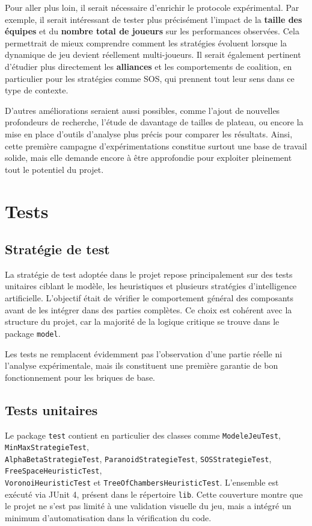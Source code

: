 \documentclass[11pt,a4paper]{article}
\begin{document}
Pour aller plus loin, il serait nécessaire d’enrichir le protocole expérimental. Par exemple, il serait intéressant de tester plus précisément l’impact de la \textbf{taille des équipes} et du \textbf{nombre total de joueurs} sur les performances observées. Cela permettrait de mieux comprendre comment les stratégies évoluent lorsque la dynamique de jeu devient réellement multi-joueurs. Il serait également pertinent d’étudier plus directement les \textbf{alliances} et les comportements de coalition, en particulier pour les stratégies comme SOS, qui prennent tout leur sens dans ce type de contexte.

D’autres améliorations seraient aussi possibles, comme l’ajout de nouvelles profondeurs de recherche, l’étude de davantage de tailles de plateau, ou encore la mise en place d’outils d’analyse plus précis pour comparer les résultats. Ainsi, cette première campagne d’expérimentations constitue surtout une base de travail solide, mais elle demande encore à être approfondie pour exploiter pleinement tout le potentiel du projet.

\section{Tests}
\subsection{Stratégie de test}

La stratégie de test adoptée dans le projet repose principalement sur des tests unitaires ciblant le modèle, les heuristiques et plusieurs stratégies d'intelligence artificielle. L'objectif était de vérifier le comportement général des composants avant de les intégrer dans des parties complètes. Ce choix est cohérent avec la structure du projet, car la majorité de la logique critique se trouve dans le package \texttt{model}.

Les tests ne remplacent évidemment pas l'observation d'une partie réelle ni l'analyse expérimentale, mais ils constituent une première garantie de bon fonctionnement pour les briques de base.

\subsection{Tests unitaires}

Le package \texttt{test} contient en particulier des classes comme \texttt{ModeleJeuTest}, \texttt{MinMaxStrategieTest}, \\\texttt{AlphaBetaStrategieTest}, \texttt{ParanoidStrategieTest}, \texttt{SOSStrategieTest}, \texttt{FreeSpaceHeuristicTest}, \\\texttt{VoronoiHeuristicTest} et \texttt{TreeOfChambersHeuristicTest}. L'ensemble est exécuté via JUnit 4, présent dans le répertoire \texttt{lib}. Cette couverture montre que le projet ne s'est pas limité à une validation visuelle du jeu, mais a intégré un minimum d'automatisation dans la vérification du code.
\end{document}
